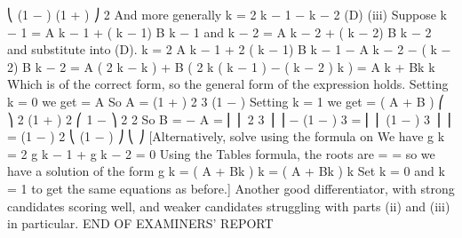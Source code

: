 ⎝ (1 − \alpha ) (1 + \alpha ) ⎠
2 \alpha{}%
And more generally \gamma k = 2 \alpha\gamma k − 1 −  \gamma k − 2 (D)
(iii)
Suppose \gamma k − 1 = A \alpha k − 1 + ( k − 1) B \alpha k − 1 and \gamma k − 2 = A \alpha k − 2 + ( k − 2) B \alpha k − 2 and
substitute into (D).
\gamma k = 2 \alpha A \alpha k − 1 + 2 \alpha ( k − 1) B \alpha k − 1 −  A \alpha k − 2 − ( k − 2)  B \alpha k − 2
= A ( 2 \alpha k − \alpha k ) + B ( 2 \alpha k ( k − 1 ) − ( k − 2 ) \alpha k ) = A \alpha k + Bk \alpha k
Which is of the correct form, so the general form of the expression holds.
Setting k = 0 we get  = A
So A =
(1 +  )
2 3
(1 − \alpha )
Setting k = 1 we get  = ( A + B ) \alpha
⎛
⎞ 2 (1 +  ) 2 ⎛ 1 −  ⎞ 2
2 \alpha
So B = − A = ⎜ ⎜
2 3 ⎟
⎟ \sigma − (1 −  ) 3 \sigma = ⎜ ⎜ (1 −  ) 3 ⎟ ⎟ \sigma = (1 −  ) 2
\alpha
⎝ \alpha (1 − \alpha ) ⎠
⎝
⎠
[Alternatively, solve using the formula on %
We have g k = 2 \alpha g k − 1 +  g k − 2 = 0
Using the Tables formula, the roots are  =  = \alpha so we have a solution
of the form g k = ( A + Bk ) \lambda k = ( A + Bk ) \alpha k
Set k = 0 and k = 1 to get the same equations as before.]
Another good differentiator, with strong candidates scoring well, and weaker candidates
struggling with parts (ii) and (iii) in particular.
END OF EXAMINERS’ REPORT
